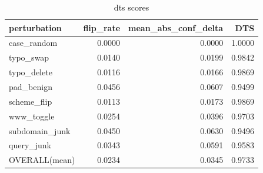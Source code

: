 \begin{table}[htbp]
\caption{dts scores}
\label{tab:dts_scores}
\begin{tabular}{lrrr}
\toprule
perturbation & flip_rate & mean_abs_conf_delta & DTS \\
\midrule
case\_random & 0.0000 & 0.0000 & 1.0000 \\
typo\_swap & 0.0140 & 0.0199 & 0.9842 \\
typo\_delete & 0.0116 & 0.0166 & 0.9869 \\
pad\_benign & 0.0456 & 0.0607 & 0.9499 \\
scheme\_flip & 0.0113 & 0.0173 & 0.9869 \\
www\_toggle & 0.0254 & 0.0396 & 0.9703 \\
subdomain\_junk & 0.0450 & 0.0630 & 0.9496 \\
query\_junk & 0.0343 & 0.0591 & 0.9583 \\
OVERALL(mean) & 0.0234 & 0.0345 & 0.9733 \\
\bottomrule
\end{tabular}
\end{table}
